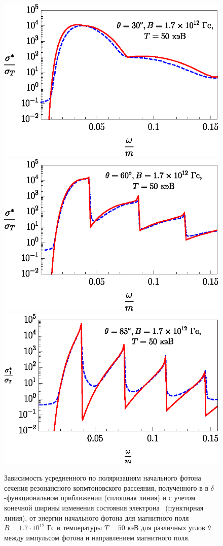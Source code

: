 \documentclass[cp1251%
               ]{jetp} %
\begin{document}
\begin{figure}[t!]\centering
\includegraphics[width=0.9\linewidth,clip]{fig4_1.eps}
\includegraphics[width=0.9\linewidth,clip]{fig4_2.eps}
\includegraphics[width=0.9\linewidth,clip]{fig4_3.eps}
\caption{Зависимость усредненного по поляризациям начального фотона сечения резонансного копмтоновского рассеяния, полученного в в $\delta$-функциональном приближении (сплошная линия) и с учетом конечной ширины изменения состояния электрона~\cite{Harding:1991} (пунктирная линия), от энергии начального фотона для магнитного поля $B = 1.7 \cdot 10^{12}$ Гс и температуры $T=50$ кэВ для различных углов $\theta$ между импульсом фотона и направлением магнитного поля.}
\label{fig4}
\end{figure}
\end{document}
